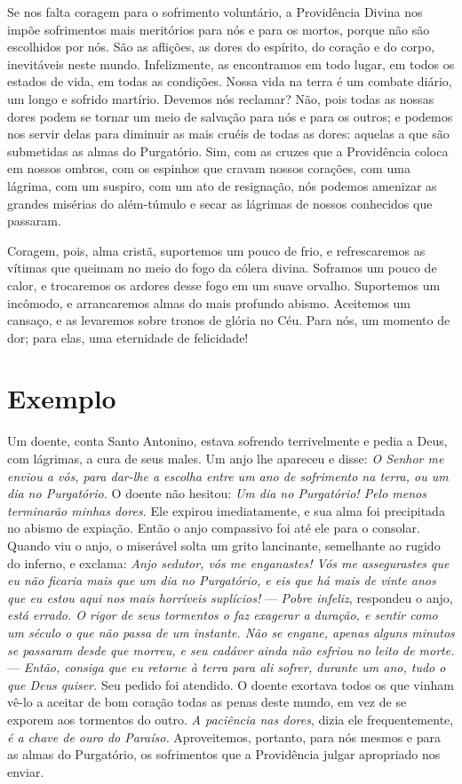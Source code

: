 Se nos falta coragem para o sofrimento voluntário, a Providência Divina nos impõe sofrimentos mais meritórios para nós e para os mortos, porque não são escolhidos por nós. São as aflições, as dores do espírito, do coração e do corpo, inevitáveis neste mundo. Infelizmente, as encontramos em todo lugar, em todos os estados de vida, em todas as condições. Nossa vida na terra é um combate diário, um longo e sofrido martírio. Devemos nós reclamar? Não, pois todas as nossas dores podem se tornar um meio de salvação para nós e para os outros; e podemos nos servir delas para diminuir as mais cruéis de todas as dores: aquelas a que são submetidas as almas do Purgatório. Sim, com as cruzes que a Providência coloca em nossos ombros, com os espinhos que cravam nossos corações, com uma lágrima, com um suspiro, com um ato de resignação, nós podemos amenizar as grandes misérias do além-túmulo e secar as lágrimas de nossos conhecidos que passaram. 

Coragem, pois, alma cristã, suportemos um pouco de frio, e refrescaremos as vítimas que queimam no meio do fogo da cólera divina. Soframos um pouco de calor, e trocaremos os ardores desse fogo em um suave orvalho. Suportemos um incômodo, e arrancaremos almas do mais profundo abismo. Aceitemos um cansaço, e as levaremos sobre tronos de glória no Céu. Para nós, um momento de dor; para elas, uma eternidade de felicidade!


\section*{Exemplo }

Um doente, conta Santo Antonino, estava sofrendo terrivelmente e pedia a Deus, com lágrimas, a cura de seus males. Um anjo lhe apareceu e disse: \textit{O Senhor me enviou a vós, para dar-lhe a escolha entre um ano de sofrimento na terra, ou um dia no Purgatório.} O doente não hesitou: \textit{Um dia no Purgatório! Pelo menos terminarão minhas dores.} Ele expirou imediatamente, e sua alma foi precipitada no abismo de expiação. Então o anjo compassivo foi até ele para o consolar. Quando viu o anjo, o miserável solta um grito lancinante, semelhante ao rugido do inferno, e exclama: \textit{Anjo sedutor, vós me enganastes! Vós me assegurastes que eu não ficaria mais que um dia no Purgatório, e eis que há mais de vinte anos que eu estou aqui nos mais horríveis suplícios!} --- \textit{Pobre infeliz}, respondeu o anjo, \textit{está errado. O rigor de seus tormentos o faz exagerar a duração, e sentir como um século o que não passa de um instante. Não se engane, apenas alguns minutos se passaram desde que morreu, e seu cadáver ainda não esfriou no leito de morte.} --- \textit{Então, consiga que eu retorne à terra para ali sofrer, durante um ano, tudo o que Deus quiser.} Seu pedido foi atendido. O doente exortava todos os que vinham vê-lo a aceitar de bom coração todas as penas deste mundo, em vez de se exporem aos tormentos do outro. \textit{A paciência nas dores}, dizia ele frequentemente, \textit{é a chave de ouro do Paraíso.} Aproveitemos, portanto, para nós mesmos e para as almas do Purgatório, os sofrimentos que a Providência julgar apropriado nos enviar.


